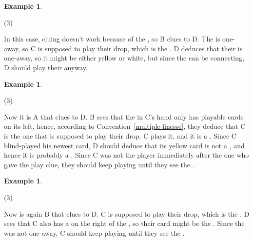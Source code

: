 \documentclass[a4paper]{article}
\theoremstyle{plain}
\theoremstyle{definition}
\newtheorem{example}[theorem]{Example}
\begin{document}
\begin{example}
	\hfill
	\begin{tasks}(3)
		\task[+]      
		\task[A]    
		\task[B]    
		\task[C]    
		\task[D]    
		\task[E]    
	\end{tasks}
	
	In this case, cluing  doesn't work because of the , so B clues  to D. The  is one-away, so C is supposed to play their drop, which is the . D deduces that their  is one-away, so it might be either yellow or white, but since the  can be connecting, D should play their  anyway.
\end{example}

\begin{example}
	\hfill
	\begin{tasks}(3)
		\task[+]      
		\task[A]    
		\task[B]    
		\task[C]    
		\task[D]    
		\task[E]    
	\end{tasks}
	
	Now it is A that clues  to D. B sees that the  in C's hand only has playable cards on its left, hence, according to Convention~\ref{multiple-finesse}, they deduce that C is the one that is supposed to play their drop. C plays it, and it is a . Since C blind-played his newest card, D should deduce that its yellow card is not a , and hence it is probably a . Since C was not the player immediately after the one who gave the play clue, they should keep playing until they see the .
\end{example}

\begin{example}
	\hfill
	\begin{tasks}(3)
		\task[+]      
		\task[A]    
		\task[B]    
		\task[C]    
		\task[D]    
		\task[E]    
	\end{tasks}
	
	Now is again B that clues  to D. C is supposed to play their drop, which is the . D sees that C also has a  on the right of the , so their card might be the . Since the  was not one-away, C should keep playing until they see the .
\end{example}
\end{document}
